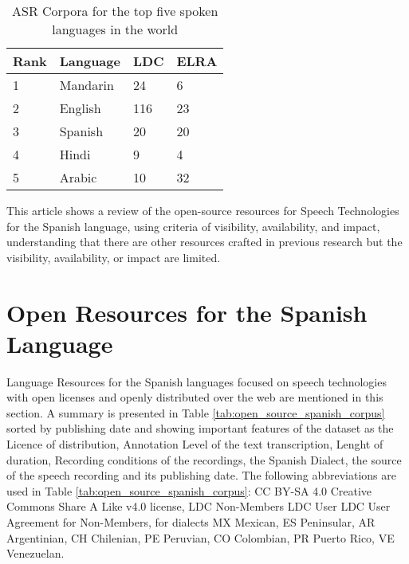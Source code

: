 \documentclass[10pt, a4paper]{article}
\begin{document}
\begin{table}[h]
\caption{ASR Corpora for the top five spoken languages in the world \cite{HernndezMena2017}}
\label{tab:resources_by_langauge}
\begin{tabular}{|l|l|l|l|}
\hline
Rank & Language & LDC & ELRA \\ \hline
1    & Mandarin & 24  & 6    \\ \hline
2    & English  & 116 & 23   \\ \hline
3    & Spanish  & 20  & 20   \\ \hline
4    & Hindi    & 9   & 4    \\ \hline
5    & Arabic   & 10  & 32   \\ \hline
\end{tabular}
\end{table}


This article shows a review of the open-source resources for Speech Technologies for the Spanish language, using criteria of visibility, availability, and impact, understanding that there are other resources crafted in previous research but the visibility, availability, or impact are limited.

\section{Open Resources for the Spanish Language}

Language Resources for the Spanish languages focused on speech technologies with open licenses and openly distributed over the web are mentioned in this section. A summary is presented in Table \ref{tab:open_source_spanish_corpus} sorted by publishing date and showing important features of the dataset as the Licence of distribution, Annotation Level of the text transcription, Lenght of duration, Recording conditions of the recordings, the Spanish Dialect, the source of the speech recording and its publishing date. The following abbreviations are used in Table \ref{tab:open_source_spanish_corpus}: CC BY-SA 4.0 Creative Commons Share A Like v4.0 license, LDC Non-Members LDC User LDC User Agreement for Non-Members, for dialects MX Mexican, ES Peninsular, AR Argentinian, CH Chilenian, PE Peruvian, CO Colombian, PR Puerto Rico, VE Venezuelan.
\end{document}

